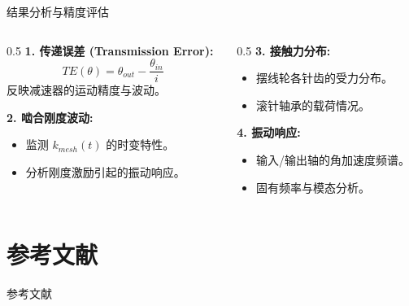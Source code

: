 \documentclass[aspectratio=169,10pt,xcolor=table]{ctexbeamer}
\begin{document}
\begin{frame}{结果分析与精度评估}
  \begin{columns}
    \begin{column}{0.5\textwidth}
      \textbf{1. 传递误差 (Transmission Error):}
      \begin{equation}
      TE(\theta) = \theta_{out} - \frac{\theta_{in}}{i}
      \end{equation}
      反映减速器的运动精度与波动。

      \vspace{0.5em}
      \textbf{2. 啮合刚度波动:}
      \begin{itemize}
          \item 监测 $k_{mesh}(t)$ 的时变特性。
          \item 分析刚度激励引起的振动响应。
      \end{itemize}
    \end{column}
    \begin{column}{0.5\textwidth}
      \textbf{3. 接触力分布:}
      \begin{itemize}
          \item 摆线轮各针齿的受力分布。
          \item 滚针轴承的载荷情况。
      \end{itemize}
      
      \vspace{0.5em}
      \textbf{4. 振动响应:}
      \begin{itemize}
          \item 输入/输出轴的角加速度频谱。
          \item 固有频率与模态分析。
      \end{itemize}
    \end{column}
  \end{columns}
\end{frame}

\section{参考文献}

\begin{frame}[allowframebreaks]{参考文献}
  \nocite{*}
  
\end{frame}
\end{document}
